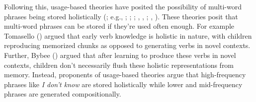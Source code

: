 \documentclass[
  12pt,
  letterpaper,
]{scrreport}
\begin{document}
Following this, usage-based theories have posited the possibility of
multi-word phrases being stored holistically
(; e.g.,
;
; ;
,
,
;
,
). These theories
posit that multi-word phrases can be stored if they're used often
enough. For example Tomasello
()
argued that early verb knowledge is holistic in nature, with children
reproducing memorized chunks as opposed to generating verbs in novel
contexts. Further, Bybee () argued that
after learning to produce these verbs in novel contexts, children don't
necessarily flush these holistic representations from memory. Instead,
proponents of usage-based theories argue that high-frequency phrases
like \emph{I don't know} are stored holistically while lower and
mid-frequency phrases are generated compositionally.
\end{document}
